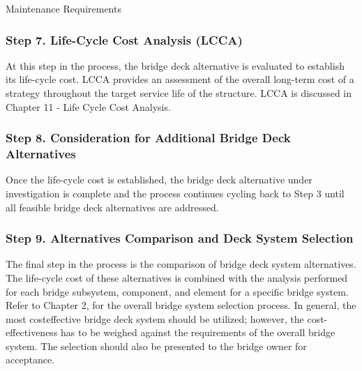 \begin{table}
  \caption{Maintenance Requirements}\label{tab:maintenance-requirements}
\end{table}

\subsubsection*{Step 7. Life-Cycle Cost Analysis (LCCA)}
At this step in the process, the bridge deck alternative is evaluated to establish its life-cycle cost. LCCA provides
an assessment of the overall long-term cost of a strategy throughout the target service life of the structure. LCCA is
discussed in Chapter 11 - Life Cycle Cost Analysis.
\subsubsection*{Step 8. Consideration for Additional Bridge Deck Alternatives}
Once the life-cycle cost is established, the bridge deck alternative under investigation is complete and the process
continues cycling back to Step 3 until all feasible bridge deck alternatives are addressed.
\subsubsection*{Step 9. Alternatives Comparison and Deck System Selection}
The final step in the process is the comparison of bridge deck system alternatives. The life-cycle cost of these
alternatives is combined with the analysis performed for each bridge subsystem, component, and element for a
specific bridge system. Refer to Chapter 2, for the overall bridge system selection process. In general, the most costeffective
bridge deck system should be utilized; however, the cost-effectiveness has to be weighed against the
requirements of the overall bridge system. The selection should also be presented to the bridge owner for
acceptance.